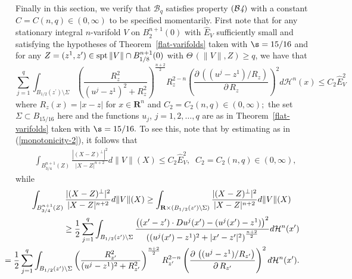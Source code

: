 \documentclass[a4paper,11pt]{amsart}
\begin{document}
Finally in this section, we verify that ${\mathcal B}_{q}$ satisfies property $({\mathcal B{\emph 4}})$ with a constant $C = C(n, q) \in (0, \infty)$ to be specified momentarily. First note that for any stationary integral $n$-varifold $V$ on $B_{2}^{n+1}(0)$ with ${\hat E}_{V}$ sufficiently small and satisfying the hypotheses of Theorem~\ref{flat-varifolds} taken with $\s = 15/16$ and for any $Z = (z^{1}, z^{\prime}) \in {\rm spt} \, \|V\| \cap B_{1/8}^{n+1}(0)$ with $\Theta \, (\|V\|, Z) \geq q$, we have that  
\begin{equation}\label{step2-4-1}
\sum_{j=1}^{q}\int_{B_{1/2}(z^{\prime}) \setminus \Sigma}
\left(\frac{R_{z}^{2}}{(u^{j} - z^{1})^{2} + R_{z}^{2}}\right)^{\frac{n+2}{2}} R_{z}^{2-n} \left(\frac{\partial \, \left((u^{j} - z^{1})/R_{z}\right)}{\partial \, R_{z}}\right)^{2} d{\mathcal H}^{n}(x) \leq C_{2}{\hat E}_{V}^{2}
\end{equation}
where $R_{z}(x) = |x - z|$ for $x \in {\mathbf R}^{n}$ and $C_{2} = C_{2}(n, q) \in (0, \infty);$ the set $\Sigma \subset B_{15/16}$ here and the functions 
$u_{j}$, $j=1, 2, \ldots, q$ are as in Theorem~\ref{flat-varifolds} taken with $\s = 15/16.$ To see this, note that by estimating as in (\ref{monotonicity-2}), it follows that
\begin{eqnarray*}
\int_{B^{n+1}_{3/4}(Z)} \frac{|(X - Z)^{\perp}|^{2}}{|X - Z|^{n+2}} d\|V\|(X) \leq C_{2}{\hat E}_{V}^{2}, \;\; C_{2} = C_{2}(n, q) \in (0, \infty),
\end{eqnarray*}
while
\begin{eqnarray*}
\int_{B^{n+1}_{3/4}(Z)} \frac{|(X - Z)^{\perp}|^{2}}{|X - Z|^{n+2}} d\|V\|(X) \geq \int_{{\mathbf R} \times (B_{1/2}(z^{\prime}) \setminus \Sigma)} \frac{|(X - Z)^{\perp}|^{2}}{|X - Z|^{n+2}} d\|V\|(X)&&\nonumber\\
&&\hspace{-4in}\geq\frac{1}{2}\sum_{j=1}^{q} \int_{B_{1/2}(z^{\prime}) \setminus \Sigma} 
\frac{\left((x^{\prime} - z^{\prime}) \cdot Du^{j}(x^{\prime}) - (u^{j}(x^{\prime}) - z^{1})\right)^{2}}
{\left((u^{j}(x^{\prime}) - z^{1})^{2} + |x^{\prime} - z^{\prime}|^{2}\right)^{\frac{n+2}{2}}}d{\mathcal H}^{n}(x^{\prime})\nonumber\\
&&\hspace{-5in}=\frac{1}{2}\sum_{j=1}^{q}\int_{B_{1/2}(z^{\prime}) \setminus \Sigma}
\left(\frac{R_{z^{\prime}}^{2}}{(u^{j} - z^{1})^{2} + R_{z^{\prime}}^{2}}\right)^{\frac{n+2}{2}} R_{z^{\prime}}^{2-n} \left(\frac{\partial \, \left((u^{j} - z^{1})/R_{z^{\prime}}\right)}{\partial \, R_{z^{\prime}}}\right)^{2} d{\mathcal H}^{n}(x^{\prime}).
\end{eqnarray*}
\end{document}

